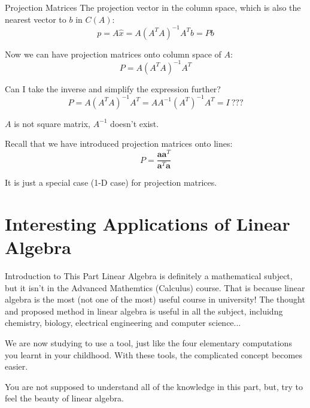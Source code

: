 \documentclass{beamer}
\begin{document}
\begin{frame}{Projection Matrices}
The projection vector in the column space, which is also the nearest vector to $b$ in $C(A)$:
\begin{equation*}
    p=A\hat{x}=A\left( A^TA \right) ^{-1}A^Tb=Pb
\end{equation*}

Now we can have projection matrices onto column space of $A$:
\begin{equation*}
    P=A\left( A^TA \right) ^{-1}A^T
\end{equation*}

Can I take the inverse and simplify the expression further?
\begin{equation*}
    P=A\left( A^TA \right) ^{-1}A^T=AA^{-1}(A^T)^{-1}A^T=I\:???
\end{equation*}

$A$ is not square matrix, $A^{-1}$ doesn't exist.

\vspace{3pt}
Recall that we have introduced projection matrices onto lines:
\begin{equation*}
    P=\frac{\mathbf{aa}^T}{\mathbf{a}^T\mathbf{a}}
\end{equation*}

It is just a special case (1-D case) for projection matrices.
\end{frame}

\section{Interesting Applications of Linear Algebra}
\begin{frame}{Introduction to This Part}
Linear Algebra is definitely a mathematical subject, but it isn't in the Advanced Mathemtics (Calculus) course. That is because linear algebra is the most (not one of the most) useful course in university! The thought and proposed method in linear algebra is useful in all the subject, incluidng chemistry, biology, electrical engineering and computer science...

\vspace{3pt}
We are now studying to use a tool, just like the four elementary computations you learnt in your childhood. With these tools, the complicated concept becomes easier.

\vspace{3pt}
You are not supposed to understand all of the knowledge in this part, but, try to feel the beauty of linear algebra.
\end{frame}
\end{document}
